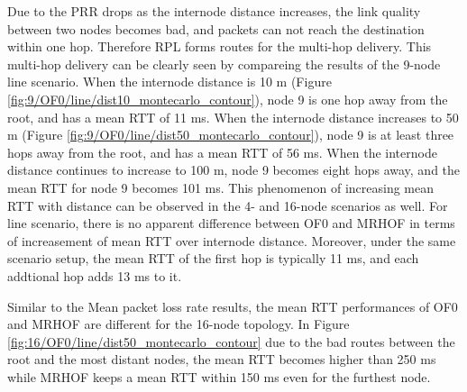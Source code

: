 Due to the PRR drops as the internode distance increases, the link quality between two nodes becomes bad, and packets can not reach the destination within one hop. Therefore RPL forms routes for the multi-hop delivery. This multi-hop delivery can be clearly seen by compareing the results of the 9-node line scenario. When the internode distance is 10 m (Figure \ref{fig:9/OF0/line/dist10_montecarlo_contour}), node 9 is one hop away from the root, and has a mean RTT of 11 ms. When the internode distance increases to 50 m (Figure \ref{fig:9/OF0/line/dist50_montecarlo_contour}), node 9 is at least three hops away from the root, and has a mean RTT of 56 ms. When the internode distance continues to increase to 100 m, node 9 becomes eight hops away, and the mean RTT for node 9 becomes 101 ms. This phenomenon of increasing mean RTT with distance can be observed in the 4- and 16-node scenarios as well. For line scenario, there is no apparent difference between OF0 and MRHOF in terms of increasement of mean RTT over internode distance. Moreover, under the same scenario setup, the mean RTT of the first hop is typically 11 ms, and each addtional hop adds 13 ms to it.
\newline

Similar to the Mean packet loss rate results, the mean RTT performances of OF0 and MRHOF are different for the 16-node topology. In Figure \ref{fig:16/OF0/line/dist50_montecarlo_contour} due to the bad routes between the root and the most distant nodes, the mean RTT becomes higher than 250 ms while MRHOF keeps a mean RTT within 150 ms even for the furthest node.
\newline

